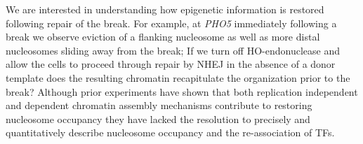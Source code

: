 We are interested in understanding how epigenetic information is restored following repair of the break. %
For example, at \textit{PHO5} immediately following a break we observe eviction of a flanking nucleosome as well as more distal nucleosomes sliding away from the break; 
If we turn off HO-endonuclease and 
allow the cells to proceed through repair by NHEJ in the absence of a donor template %
does the resulting chromatin recapitulate the organization prior to the break? Although prior experiments have shown that both replication independent and dependent chromatin assembly mechanisms contribute to restoring nucleosome occupancy\citep{Li2016-wg}
they have lacked the resolution to precisely and quantitatively describe nucleosome occupancy and the re-association of TFs.
  
